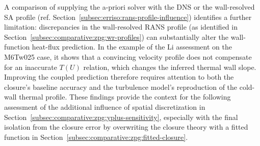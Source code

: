 A comparison of supplying the a-priori solver with the DNS or the wall-resolved SA profile (ref. Section~\ref{subsec:erriso:rans-profile-influence}) identifies a further limitation: discrepancies in the wall-resolved RANS profile (as identified in Section~\ref{subsec:comparative:zpg:wr-profiles}) can substantially alter the wall-function heat-flux prediction. In the example of the Li assessment on the M6Tw025 case, it shows that a convincing velocity profile does not compensate for an inaccurate \(T(U)\) relation, which changes the inferred thermal wall slope. Improving the coupled prediction therefore requires attention to both the closure's baseline accuracy and the turbulence model's reproduction of the cold-wall thermal profile. These findings provide the context for the following assessment of the additional influence of spatial discretization in Section~\ref{subsec:comparative:zpg:yplus-sensitivity}, especially with the final isolation from the closure error by overwriting the closure theory with a fitted function in Section~\ref{subsec:comparative:zpg:fitted-closure}.
